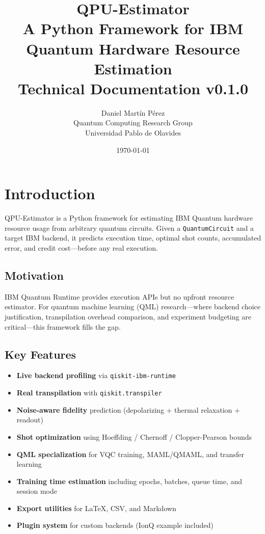 \documentclass[11pt,a4paper]{article}
\title{\textbf{QPU-Estimator}\\\Large A Python Framework for IBM Quantum Hardware Resource Estimation\\\vspace{0.5em}\large Technical Documentation v0.1.0}
\author{Daniel Mart\'{i}n P\'{e}rez\\Quantum Computing Research Group\\Universidad Pablo de Olavides}
\date{\today}
\begin{document}
\maketitle
\tableofcontents
\newpage

\section{Introduction}

QPU-Estimator is a Python framework for estimating IBM Quantum hardware resource usage from arbitrary quantum circuits. Given a \texttt{QuantumCircuit} and a target IBM backend, it predicts execution time, optimal shot counts, accumulated error, and credit cost---before any real execution.

\subsection{Motivation}

IBM Quantum Runtime provides execution APIs but no upfront resource estimator. For quantum machine learning (QML) research---where backend choice justification, transpilation overhead comparison, and experiment budgeting are critical---this framework fills the gap.

\subsection{Key Features}

\begin{itemize}[leftmargin=2em]
    \item \textbf{Live backend profiling} via \texttt{qiskit-ibm-runtime}
    \item \textbf{Real transpilation} with \texttt{qiskit.transpiler}
    \item \textbf{Noise-aware fidelity} prediction (depolarizing + thermal relaxation + readout)
    \item \textbf{Shot optimization} using Hoeffding / Chernoff / Clopper-Pearson bounds
    \item \textbf{QML specialization} for VQC training, MAML/QMAML, and transfer learning
    \item \textbf{Training time estimation} including epochs, batches, queue time, and session mode
    \item \textbf{Export utilities} for LaTeX, CSV, and Markdown
    \item \textbf{Plugin system} for custom backends (IonQ example included)
\end{itemize}
\end{document}
